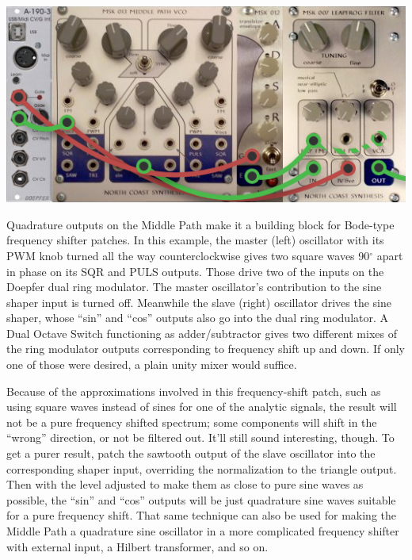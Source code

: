 \nopagebreak\noindent
{\hspace*{\fill}\includegraphics[scale=0.4]{mp-patch4.png}\hspace*{\fill}\par} 

Quadrature outputs on the Middle Path make it a building block for
Bode-type frequency shifter patches.  In this example, the master (left)
oscillator with its PWM knob turned all the way counterclockwise gives two
square waves 90$^\circ$ apart in phase on its SQR and PULS outputs.  Those drive
two of the inputs on the Doepfer dual ring modulator.  The master
oscillator's contribution to the sine shaper input is turned off.  Meanwhile
the slave (right) oscillator drives the sine shaper, whose ``sin'' and
``cos'' outputs also go into the dual ring modulator.  A Dual Octave Switch
functioning as adder/subtractor gives two different mixes of the ring
modulator outputs corresponding to frequency shift up and down.  If only one
of those were desired, a plain unity mixer would suffice.

Because of the approximations involved in this frequency-shift patch, such
as using square waves instead of sines for one of the analytic signals, the
result will not be a pure frequency shifted spectrum; some components will
shift in the ``wrong'' direction, or not be filtered out.  It'll still sound
interesting, though.  To get a purer result, patch the sawtooth output of
the slave oscillator into the corresponding shaper input, overriding the
normalization to the triangle output.  Then with the level adjusted to make
them as close to pure sine waves as possible, the ``sin'' and ``cos''
outputs will be just quadrature sine waves suitable for a pure frequency
shift.  That same technique can also be used for making the Middle Path a
quadrature sine oscillator in a more complicated frequency shifter
with external input, a Hilbert transformer, and so on.

